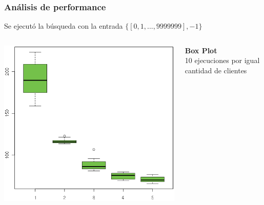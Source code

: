 \begin{frame}\frametitle{Análisis de performance}
    \centering
    Se ejecutó la búsqueda con la entrada $\{[0, 1, ..., 9999999], -1\}$
    
    \begin{columns}[T]
        \begin{column}{.6\textwidth}
            \flushright
            \includegraphics[scale=0.3]{images/execution_boxplot.png}
        \end{column}
        \begin{column}{.4\textwidth}
            \begin{center}
                \textbf{Box Plot}\\[0.3cm]
                10 ejecuciones por igual cantidad de clientes
            \end{center}
        \end{column}
    \end{columns}
\end{frame}



